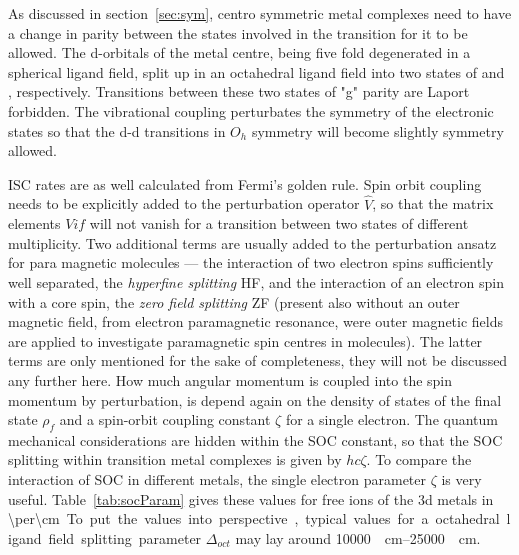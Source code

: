 			As discussed in section~\ref{sec:sym}, centro symmetric metal complexes need to have a change in parity between the states involved in the transition for it to be allowed. The d-orbitals of the metal centre, being five fold degenerated in a spherical ligand field, split up in an octahedral ligand field into two states of  and , respectively. Transitions between these two states of "g" parity are Laport forbidden. The vibrational coupling perturbates the symmetry of the electronic states so that the d-d transitions in $O_h$ symmetry will become slightly symmetry allowed.

			ISC rates are as well calculated from Fermi's golden rule. Spin orbit coupling needs to be explicitly added to the perturbation operator $\hat{V}$, so that the matrix elements $V{if}$ will not vanish for a transition between two states of different multiplicity. Two additional terms are usually added to the perturbation ansatz for para magnetic molecules --- the interaction of two electron spins sufficiently well separated, the \emph{hyperfine splitting} HF, and the interaction of an electron spin with a core spin, the \emph{zero field splitting} ZF (present also without an outer magnetic field, from electron paramagnetic resonance, were outer magnetic fields are applied to investigate paramagnetic spin centres in molecules). The latter terms are only mentioned for the sake of completeness, they will not be discussed any further here. How much angular momentum is coupled into the spin momentum by perturbation, is depend again on the density of states of the final state $\rho_f$ and a spin-orbit coupling constant $\zeta$ for a single electron. The quantum mechanical considerations are hidden within the SOC constant, so that the SOC splitting within transition metal complexes is given by $hc\zeta$. To compare the interaction of SOC in different metals, the single electron parameter $\zeta$ is very useful. Table~\ref{tab:socParam} gives these values for free ions of the 3d metals in \qty{\per\cm}. To put the values into perspective, typical values for a octahedral ligand field splitting parameter $\Delta_{oct}$ may lay around \qtyrange{10000}{25000}{\per\cm}. 


